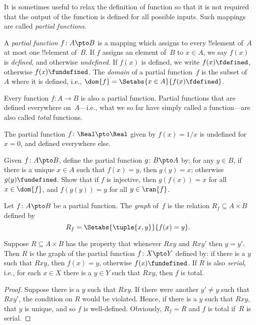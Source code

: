 \documentclass[../../../include/open-logic-section]{subfiles}
\begin{document}

\begin{explain}
It is sometimes useful to relax the definition of function so that it
is not required that the output of the function is defined for all
possible inputs. Such mappings are called \emph{partial functions}.
\end{explain}

\begin{defn}
A \emph{partial function} $f \colon A \pto B$ is a mapping which
assigns to every !!{element} of~$A$ at most one !!{element} of~$B$.
If $f$ assigns an element of~$B$ to $x \in A$, we say $f(x)$ is
\emph{defined}, and otherwise \emph{undefined}. If $f(x)$ is defined,
we write $f(x) \fdefined$, otherwise $f(x) \fundefined$. The
\emph{domain} of a partial function~$f$ is the subset of~$A$ where it
is defined, i.e., $\dom{f} = \Setabs{x \in A}{f(x) \fdefined}$.
\end{defn}

\begin{ex}
Every function $f\colon A \to B$ is also a partial function. Partial
functions that are defined everywhere on~$A$---i.e., what we so far
have simply called a function---are also called \emph{total}
functions.
\end{ex}

\begin{ex}
The partial function $f \colon \Real \pto \Real$ given by $f(x) = 1/x$
is undefined for $x = 0$, and defined everywhere else.
\end{ex}

\begin{prob}
Given $f\colon A \pto B$, define the partial function $g\colon B \pto
A$ by: for any $y \in B$, if there is a unique $x \in A$ such that
$f(x) = y$, then $g(y) = x$; otherwise $g(y) \fundefined$.  Show that
if $f$ is injective, then $g(f(x)) = x$ for all $x \in \dom{f}$, and
$f(g(y)) = y$ for all $y \in \ran{f}$.
\end{prob}

\begin{defn}
Let $f\colon A \pto B$ be a partial function. The \emph{graph} of~$f$
is the relation $R_f \subseteq A \times B$ defined by
\[
R_f = \Setabs{\tuple{x,y}}{f(x) = y}.
\]
\end{defn}

\begin{prop}
Suppose $R \subseteq A \times B$ has the property that whenever $Rxy$
and $Rxy'$ then $y = y'$.  Then $R$ is the graph of the partial
function $f\colon X \pto Y$ defined by: if there is a $y$ such that
$Rxy$, then $f(x) = y$, otherwise $f(x) \fundefined$.  If $R$ is also
\emph{serial}, i.e., for each $x \in X$ there is a $y \in Y$ such that
$Rxy$, then $f$ is total.
\end{prop}

\begin{proof}
Suppose there is a $y$ such that $Rxy$.  If there were another $y'
\neq y$ such that $Rxy'$, the condition on $R$ would be
violated. Hence, if there is a $y$ such that $Rxy$, that $y$ is
unique, and so $f$ is well-defined.  Obviously, $R_f = R$ and $f$ is
total if~$R$ is serial.
\end{proof}
\end{document}
